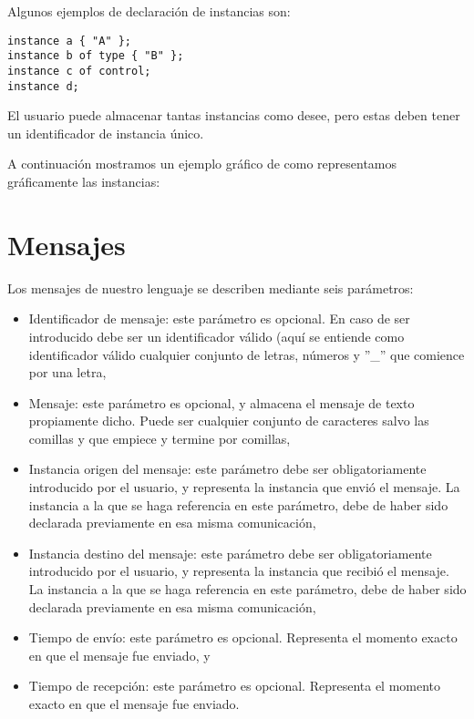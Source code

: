 Algunos ejemplos de declaración de instancias son:

\begin{lstlisting}
instance a { "A" };
instance b of type { "B" };
instance c of control;
instance d;
\end{lstlisting}

El usuario puede almacenar tantas instancias como desee, pero estas
deben tener un identificador de instancia único.

A continuación mostramos un ejemplo gráfico de como representamos
gráficamente las instancias:


\section{Mensajes}

Los mensajes de nuestro lenguaje se describen mediante seis
parámetros:

\begin{itemize}
\item Identificador de mensaje: este parámetro es opcional. En caso de
  ser introducido debe ser un identificador válido (aquí se entiende
  como identificador válido cualquier conjunto de letras, números y
  ''\_'' que comience por una letra,
\item Mensaje: este parámetro es opcional, y almacena el mensaje de
  texto propiamente dicho. Puede ser cualquier conjunto de caracteres
  salvo las comillas y que empiece y termine por comillas,
\item Instancia origen del mensaje: este parámetro debe ser
  obligatoriamente introducido por el usuario, y representa la
  instancia que envió el mensaje. La instancia a la que se haga
  referencia en este parámetro, debe de haber sido declarada
  previamente en esa misma comunicación,
\item Instancia destino del mensaje: este parámetro debe ser
  obligatoriamente introducido por el usuario, y representa la
  instancia que recibió el mensaje. La instancia a la que se haga
  referencia en este parámetro, debe de haber sido declarada
  previamente en esa misma comunicación,
\item Tiempo de envío: este parámetro es opcional. Representa el
  momento exacto en que el mensaje fue enviado, y
\item Tiempo de recepción: este parámetro es opcional. Representa el
  momento exacto en que el mensaje fue enviado.
\end{itemize}

